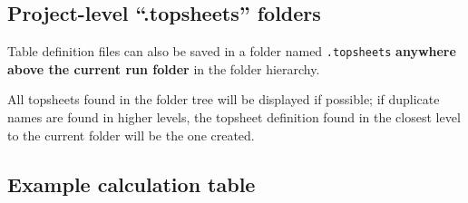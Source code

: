 \hypertarget{project-level-.topsheets-folders}{%
\subsection{Project-level ``.topsheets''
folders}\label{project-level-.topsheets-folders}}

Table definition files can also be saved in a folder named
\texttt{.topsheets} \textbf{anywhere above the current run folder} in
the folder hierarchy.

All topsheets found in the folder tree will be displayed if possible; if
duplicate names are found in higher levels, the topsheet definition
found in the closest level to the current folder will be the one
created.

\hypertarget{example-calculation-table}{%
\subsection{Example calculation table}\label{example-calculation-table}}

